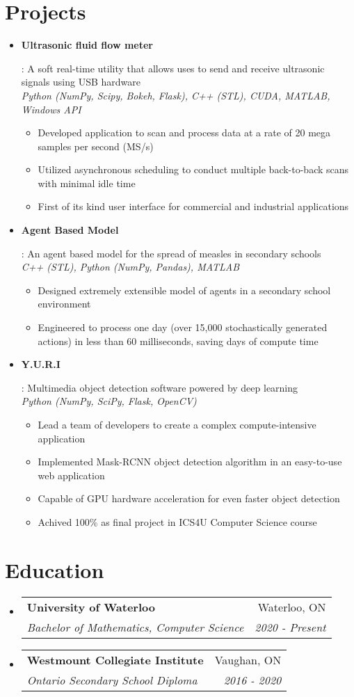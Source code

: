 \documentclass[letterpaper,10pt]{article}
\makeatletter
\newcommand{\resumeItem}[2]{
  \item\small{
    \textbf{#1}{: #2 \vspace{-2pt}}
  }
}
\newcommand{\resumeSubheading}[4]{
  \vspace{-1pt}\item[]
  \begin{tabular*}{0.98\textwidth}{l@{\extracolsep{\fill}}r}
      \hspace{-10pt}\textbf{#1} & #2 \\
      \hspace{-10pt}\textit{\small#3} & \textit{\small #4} \\
    \end{tabular*}\vspace{-5pt}
}
\newcommand{\resumeSubItem}[2]{\resumeItem{#1}{#2}\vspace{-4pt}}
\newcommand{\resumeSubHeadingListStart}{\begin{itemize}[leftmargin=*]}
\newcommand{\resumeSubHeadingListEnd}{\end{itemize}}
\newcommand{\shorterSection}[1]{\vspace{-10pt}\section{#1}}
\makeatother
\begin{document}
\shorterSection{Projects}
  \resumeSubHeadingListStart
    \resumeSubItem{Ultrasonic fluid flow meter}
     {A soft real-time utility that allows uses to send and receive ultrasonic signals using USB hardware \\
     \emph{Python (NumPy, Scipy, Bokeh, Flask), C++ (STL), CUDA, MATLAB, Windows API}
        \vspace{-5pt}
        \begin{itemize}
            \item Developed application to scan and process data at a rate of 20 mega samples per second (MS/s)
            \item Utilized asynchronous scheduling to conduct multiple back-to-back scans with minimal idle time
            \item First of its kind user interface for commercial and industrial applications
        \end{itemize}
     }
     \resumeSubItem{Agent Based Model}
     {An agent based model for the spread of measles in secondary schools \\
     \emph{C++ (STL), Python (NumPy, Pandas), MATLAB}
        \vspace{-5pt}
        \begin{itemize}
            \item Designed extremely extensible model of agents in a secondary school environment
            \item Engineered to process one day (over 15,000 stochastically generated actions) in less than 60 milliseconds, saving days of compute time
        \end{itemize}
     }
     \resumeSubItem{Y.U.R.I}
     {Multimedia object detection software powered by deep learning \\
     \emph{Python (NumPy, SciPy, Flask, OpenCV)}
        \vspace{-5pt}
        \begin{itemize}
            \item Lead a team of developers to create a complex compute-intensive application
            \item Implemented Mask-RCNN object detection algorithm in an easy-to-use web application
            \item Capable of GPU hardware acceleration for even faster object detection
            \item Achived 100\% as final project in ICS4U Computer Science course
        \end{itemize}
     }
  \resumeSubHeadingListEnd

\shorterSection{Education}
  \resumeSubHeadingListStart
    \resumeSubheading
      {University of Waterloo}{Waterloo, ON}
      {Bachelor of Mathematics, Computer Science}{2020 - Present}{}
    \resumeSubheading
      {Westmount Collegiate Institute}{Vaughan, ON}
      {Ontario Secondary School Diploma}{2016 - 2020}{}

  \resumeSubHeadingListEnd
\end{document}
